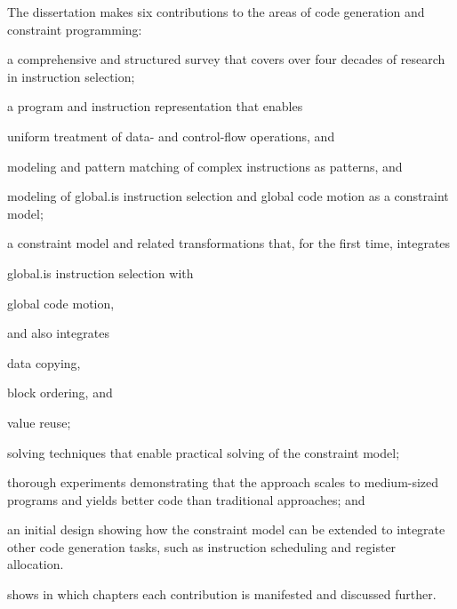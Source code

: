 The dissertation makes six contributions to the areas of code generation and
constraint programming:
%
\begin{contributions}
  \item {}
    a comprehensive and structured survey that covers over four decades of
    research in \gls{instruction selection};
  \item {}
    a program and instruction representation that enables
    \begin{contributions}
      \item {}
        uniform treatment of data- and control-flow \glspl{operation}, and
      \item {}
        modeling and pattern matching of complex \glspl{instruction} as
        \glspl{pattern}, and
      \item {}
        modeling of \gls{global.is} \gls{instruction selection} and \gls{global
          code motion} as a \gls{constraint model};
    \end{contributions}
  \item {}
    a \gls{constraint model} and related transformations that, for the first
    time, integrates
    \begin{contributions}
      \item {}
        \gls{global.is} \gls{instruction selection} with
      \item {}
        \gls{global code motion},
    \end{contributions}
    and also integrates
    \begin{contributions}[resume]
      \item {}
        \gls{data copying},
      \item {}
        \gls{block ordering}, and
      \item {}
        \gls{value reuse};
    \end{contributions}
  \item {}
    solving techniques that enable practical solving of the \gls{constraint
      model};
  \item {}
    thorough experiments demonstrating that the approach scales to medium-sized
    programs and yields better code than traditional approaches; and
  \item {}
    an initial design showing how the \gls{constraint model} can be extended to
    integrate other code generation tasks, such as \gls{instruction scheduling}
    and \gls{register allocation}.
\end{contributions}
%
 shows in which chapters each contribution
is manifested and discussed further.


